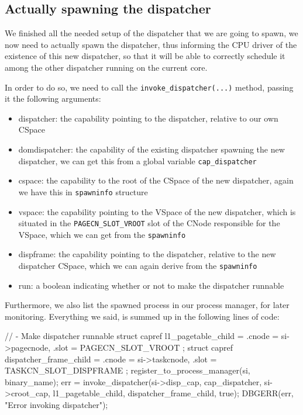 \documentclass[a4paper,twoside,openright]{report}
\begin{document}
\subsection{Actually spawning the dispatcher}
We finished all the needed setup of the dispatcher that we are going to spawn, we now need to actually spawn the dispatcher, thus informing the CPU driver of the existence of this new dispatcher, so that it will be able to correctly schedule it among the other dispatcher running on the current core.

In order to do so, we need to call the \texttt{invoke\_dispatcher(...)} method, passing it the following arguments:
\begin{itemize}
    \item dispatcher: the capability pointing to the dispatcher, relative to our own CSpace
    \item domdispatcher: the capability of the existing dispatcher spawning the new dispatcher, we can get this from a global variable \texttt{cap\_dispatcher}
    \item cspace: the capability to the root of the CSpace of the new dispatcher, again we have this in \texttt{spawninfo} structure
    \item vspace: the capability pointing to the VSpace of the new dispatcher, which is situated in the \texttt{PAGECN\_SLOT\_VROOT} slot of the CNode responsible for the VSpace, which we can get from the \texttt{spawninfo}
    \item dispframe: the capability pointing to the dispatcher, relative to the new dispatcher CSpace, which we can again derive from the \texttt{spawninfo}
    \item run: a boolean indicating whether or not to make the dispatcher runnable
\end{itemize}

Furthermore, we also list the spawned process in our process manager, for later monitoring.
Everything we said, is summed up in the following lines of code:
\begin{pandacode}
    // - Make dispatcher runnable
    struct capref l1_pagetable_child = {
            .cnode = si->pagecnode,
            .slot = PAGECN_SLOT_VROOT
    };
    struct capref dispatcher_frame_child = {
            .cnode = si->taskcnode,
            .slot = TASKCN_SLOT_DISPFRAME
    };
    register_to_process_manager(si, binary_name);
    err = invoke_dispatcher(si->disp_cap, cap_dispatcher,
            si->croot_cap, l1_pagetable_child,
            dispatcher_frame_child, true);
    DBGERR(err, "Error invoking dispatcher\n");
\end{pandacode} 
\end{document}

